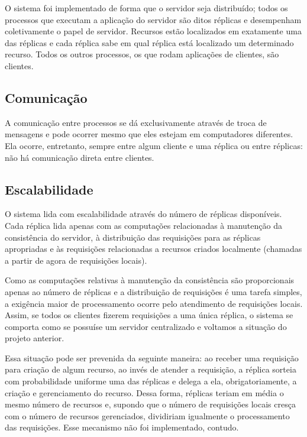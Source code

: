 \documentclass[../main.tex]{subfiles}
\begin{document}
O sistema foi implementado de forma que o servidor seja distribuído; todos os processos que executam a aplicação do servidor são ditos réplicas e desempenham coletivamente o papel de servidor.
Recursos estão localizados em exatamente uma das réplicas e cada réplica sabe em qual réplica está localizado um determinado recurso.
Todos os outros processos, os que rodam aplicações de clientes, são clientes.

\subsection{Comunicação}

A comunicação entre processos se dá exclusivamente através de troca de mensagens e pode ocorrer mesmo que eles estejam em computadores diferentes.
Ela ocorre, entretanto, sempre entre algum cliente e uma réplica ou entre réplicas: não há comunicação direta entre clientes.

\subsection{Escalabilidade}

O sistema lida com escalabilidade através do número de réplicas disponíveis.
Cada réplica lida apenas com as computações relacionadas à manutenção da consistência do servidor, à distribuição das requisições para as réplicas apropriadas e às requisições relacionadas a recursos criados localmente (chamadas a partir de agora de requisições locais).

Como as computações relativas à manutenção da consistência são proporcionais apenas ao número de réplicas e a distribuição de requisições é uma tarefa simples, a exigência maior de processamento ocorre pelo atendimento de requisições locais.
Assim, se todos os clientes fizerem requisições a uma única réplica, o sistema se comporta como se possuíse um servidor centralizado e voltamos a situação do projeto anterior.

Essa situação pode ser prevenida da seguinte maneira: ao receber uma requisição para criação de algum recurso, ao invés de atender a requisição, a réplica sorteia com probabilidade uniforme uma das réplicas e delega a ela, obrigatoriamente, a criação e gerenciamento do recurso.
Dessa forma, réplicas teriam em média o mesmo número de recursos e, supondo que o número de requisições locais cresça com o número de recursos gerenciados, dividiriam igualmente o processamento das requisições.
Esse mecanismo não foi implementado, contudo.
\end{document}
